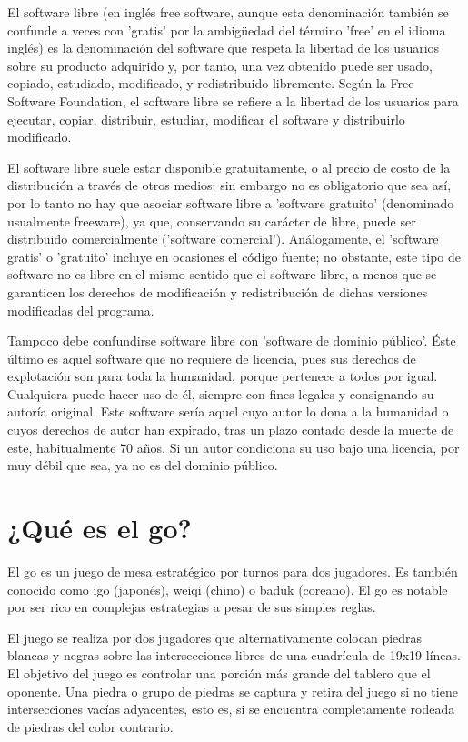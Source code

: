 \documentclass[12pt,a4paper]{report}
\begin{document}
El software libre (en inglés free software, aunque esta denominación también se
confunde a veces con 'gratis' por la ambigüedad del término 'free' en el idioma
inglés) es la denominación del software que respeta la libertad de los usuarios
sobre su producto adquirido y, por tanto, una vez obtenido puede ser usado,
copiado, estudiado, modificado, y redistribuido libremente. Según la Free
Software Foundation, el software libre se refiere a la libertad de los usuarios
para ejecutar, copiar, distribuir, estudiar, modificar el software y
distribuirlo modificado.

El software libre suele estar disponible gratuitamente, o al precio de costo de
la distribución a través de otros medios; sin embargo no es obligatorio que sea
así, por lo tanto no hay que asociar software libre a 'software gratuito'
(denominado usualmente freeware), ya que, conservando su carácter de libre,
puede ser distribuido comercialmente ('software comercial'). Análogamente, el
'software gratis' o 'gratuito' incluye en ocasiones el código fuente; no
obstante, este tipo de software no es libre en el mismo sentido que el software
libre, a menos que se garanticen los derechos de modificación y redistribución
de dichas versiones modificadas del programa.

Tampoco debe confundirse software libre con 'software de dominio público'. Éste
último es aquel software que no requiere de licencia, pues sus derechos de
explotación son para toda la humanidad, porque pertenece a todos por igual.
Cualquiera puede hacer uso de él, siempre con fines legales y consignando su
autoría original. Este software sería aquel cuyo autor lo dona a la humanidad o
cuyos derechos de autor han expirado, tras un plazo contado desde la muerte de
este, habitualmente 70 años. Si un autor condiciona su uso bajo una licencia,
por muy débil que sea, ya no es del dominio público.


\section{¿Qué es el go?}

El go es un juego de mesa estratégico por turnos para dos jugadores. Es 
también conocido como igo (japonés), weiqi (chino) o baduk (coreano). El go 
es notable por ser rico en complejas estrategias a pesar de sus simples reglas.

El juego se realiza por dos jugadores que alternativamente colocan piedras
blancas y negras sobre las intersecciones libres de una cuadrícula de 19x19
líneas. El objetivo del juego es controlar una porción más grande del tablero
que el oponente. Una piedra o grupo de piedras se captura y retira del juego si
no tiene intersecciones vacías adyacentes, esto es, si se encuentra
completamente rodeada de piedras del color contrario.
\end{document}
